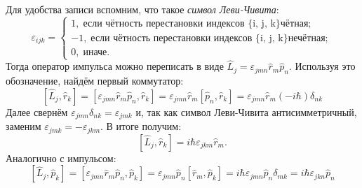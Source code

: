 Для удобства записи вспомним, что такое \textit{символ Леви-Чивита}:
\[
\varepsilon_{ijk} = 
\begin{cases}
    1,\; \text{если чётность перестановки индексов \{i, j, k\} чётная};\\
    -1,\;\text{если чётность перестановки индексов \{i, j, k\} нечётная}; \\
    0,\;\text{иначе}.
\end{cases}
\]
Тогда оператор импульса можно переписать в виде $\hat{L}_j = \varepsilon_{jmn} \hat{r}_m \hat{p}_n$. Используя это обозначение, найдём первый коммутатор:
\[
    \left[\hat{L}_j, \hat{r}_k\right] = [\varepsilon_{jmn} \hat{r}_m \hat{p}_n, \hat{r}_k] = \varepsilon_{jmn} \hat{r}_m [\hat{p}_n, \hat{r}_k] = \varepsilon_{jmn}\hat{r}_m(-i\hbar)\delta_{nk}
\]
Далее свернём $\varepsilon_{jmn}\delta_{nk} = \varepsilon_{jmk}$ и, так как символ Леви-Чивита антисимметричный, заменим $\varepsilon_{jmk} = -\varepsilon_{jkm}$. В итоге получим:
\[
\left[\hat{L}_j, \hat{r}_k\right] = i\hbar\varepsilon_{jkm}\hat{r}_m.
\]
Аналогично с импульсом:
\[
\left[\hat{L}_j, \hat{p}_k\right] = [\varepsilon_{jmn} \hat{r}_m \hat{p}_n, \hat{p}_k] = \varepsilon_{jmn} \hat{p}_n [\hat{r}_m, \hat{p}_k] = i\hbar\varepsilon_{jmn}\hat{p}_n\delta_{mk} = i\hbar\varepsilon_{jkn}\hat{p}_n
\]

